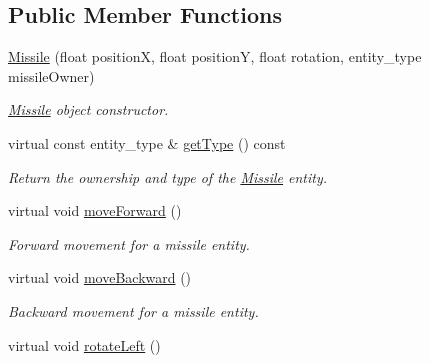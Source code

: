 \subsection*{Public Member Functions}
\begin{DoxyCompactItemize}
\item 
\hypertarget{class_missile_a2f930ea9ba87704d2ba75b0299f698c2}{\hyperlink{class_missile_a2f930ea9ba87704d2ba75b0299f698c2}{Missile} (float position\+X, float position\+Y, float rotation, entity\+\_\+type missile\+Owner)}\label{class_missile_a2f930ea9ba87704d2ba75b0299f698c2}

\begin{DoxyCompactList}\small\item\em \hyperlink{class_missile}{Missile} object constructor. \end{DoxyCompactList}\item 
\hypertarget{class_missile_a67874a53d50f63065bf1f63803558513}{virtual const entity\+\_\+type \& \hyperlink{class_missile_a67874a53d50f63065bf1f63803558513}{get\+Type} () const }\label{class_missile_a67874a53d50f63065bf1f63803558513}

\begin{DoxyCompactList}\small\item\em Return the ownership and type of the \hyperlink{class_missile}{Missile} entity. \end{DoxyCompactList}\item 
\hypertarget{class_missile_a4b6a45a5129b97a6e5383123dffab0c3}{virtual void \hyperlink{class_missile_a4b6a45a5129b97a6e5383123dffab0c3}{move\+Forward} ()}\label{class_missile_a4b6a45a5129b97a6e5383123dffab0c3}

\begin{DoxyCompactList}\small\item\em Forward movement for a missile entity. \end{DoxyCompactList}\item 
\hypertarget{class_missile_a8d8348b91961ff0c163d7d24bd9599a8}{virtual void \hyperlink{class_missile_a8d8348b91961ff0c163d7d24bd9599a8}{move\+Backward} ()}\label{class_missile_a8d8348b91961ff0c163d7d24bd9599a8}

\begin{DoxyCompactList}\small\item\em Backward movement for a missile entity. \end{DoxyCompactList}\item 
\hypertarget{class_missile_a1c7ed80bd656b0af5b3872f4225978e3}{virtual void \hyperlink{class_missile_a1c7ed80bd656b0af5b3872f4225978e3}{rotate\+Left} ()}\label{class_missile_a1c7ed80bd656b0af5b3872f4225978e3}


\end{DoxyCompactItemize}
